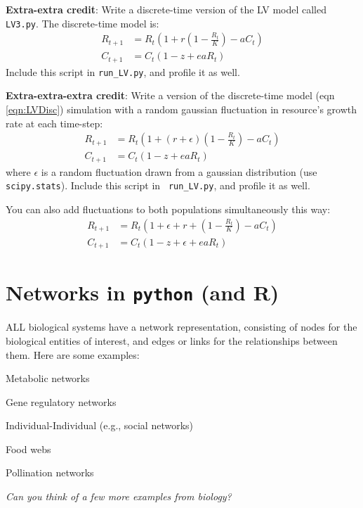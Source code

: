 {\bf Extra-extra credit}: Write a discrete-time version of the LV 
model called {\tt LV3.py}. The discrete-time model is: 
\begin{equation}\label{eqn:LVDisc} 
	\begin{aligned} 
		R_{t+1} &= R_t (1 + r (1 - \frac{R_t}{K}) - a C_t)\\ 
		C_{t+1} &= C_t (1 - z + e a R_t) 
	\end{aligned} 
\end{equation}
Include this script in {\tt run\_LV.py}, and profile it as well. 

{\bf Extra-extra-extra credit}: Write a version of the discrete-time 
model (eqn \ref{eqn:LVDisc}) simulation with a random gaussian 
fluctuation in resource's growth rate at each time-step: 
\begin{equation}\label{eqn:LVFluc1}
	\begin{aligned}
		R_{t+1} &= R_t (1 + (r + \epsilon) (1 - \frac{R_t}{K})- a C_t)\\
		C_{t+1} &= C_t (1 - z + e a R_t)
	\end{aligned}
\end{equation}
where $\epsilon$ is a random fluctuation drawn from a gaussian 
distribution (use {\tt scipy.stats}). Include this script in {\tt 
run\_LV.py}, and profile it as well. 

You can also add fluctuations to both populations simultaneously this way: 
\begin{equation}\label{eqn:LVFluc2}
	\begin{aligned}
		R_{t+1} &= R_t (1 + \epsilon + r +  (1 - \frac{R_t}{K}) - a C_t)\\
		C_{t+1} &= C_t (1 - z + \epsilon + e a R_t)
	\end{aligned} 
\end{equation}

\section{Networks in {\tt python} (and R)}

ALL biological systems have a network representation, consisting of 
nodes for the biological entities of interest, and edges or links for 
the relationships between them. Here are some examples:

\begin{compactitem}
	\item Metabolic networks
	\item Gene regulatory networks
	\item Individual-Individual (e.g., social networks)
	\item Food webs
	\item Pollination networks
\end{compactitem} 
{\it Can you think of a few more examples from biology?}

